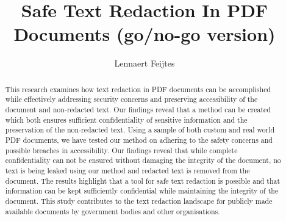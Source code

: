 \documentclass[twoside]{uva-inf-bachelor-thesis}
\title{Safe Text Redaction In PDF Documents (go/no-go version)}
\author{Lennaert Feijtes}
\begin{document}
\maketitle

\begin{abstract}

This research examines how text redaction in PDF documents can be accomplished while effectively addressing security concerns and preserving accessibility of the document and non-redacted text. Our findings reveal that a method can be created which both ensures sufficient confidentiality of sensitive information and the preservation of the non-redacted text. Using a sample of both custom and real world PDF documents, we have tested our method on adhering to the safety concerns and possible breaches in accessibility. Our findings reveal that while complete confidentiality can not be ensured without damaging the integrity of the document, no text is being leaked using our method and redacted text is removed from the document. The results highlight that a tool for safe text redaction is possible and that information can be kept sufficiently confidential while maintaining the integrity of the document. This study contributes to the text redaction landscape for publicly made available documents by government bodies and other organisations.
\end{abstract}

\tableofcontents













\end{document}
